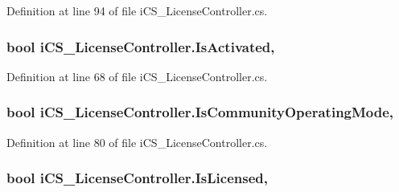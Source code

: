 Definition at line 94 of file i\+C\+S\+\_\+\+License\+Controller.\+cs.

\hypertarget{classi_c_s___license_controller_aad3df38dc7ac4c182e24b4b84d1aac85}{
\subsubsection[{Is\+Activated}]{\setlength{\rightskip}{0pt plus 5cm}bool i\+C\+S\+\_\+\+License\+Controller.\+Is\+Activated\hspace{0.3cm}{\ttfamily [static]}, {\ttfamily [get]}}}\label{classi_c_s___license_controller_aad3df38dc7ac4c182e24b4b84d1aac85}


Definition at line 68 of file i\+C\+S\+\_\+\+License\+Controller.\+cs.

\hypertarget{classi_c_s___license_controller_ae135063a15f1f112b3bf19429723ad89}{
\subsubsection[{Is\+Community\+Operating\+Mode}]{\setlength{\rightskip}{0pt plus 5cm}bool i\+C\+S\+\_\+\+License\+Controller.\+Is\+Community\+Operating\+Mode\hspace{0.3cm}{\ttfamily [static]}, {\ttfamily [get]}}}\label{classi_c_s___license_controller_ae135063a15f1f112b3bf19429723ad89}


Definition at line 80 of file i\+C\+S\+\_\+\+License\+Controller.\+cs.

\hypertarget{classi_c_s___license_controller_a2ca606cc06c0244d43a9b2d17ee0db33}{
\subsubsection[{Is\+Licensed}]{\setlength{\rightskip}{0pt plus 5cm}bool i\+C\+S\+\_\+\+License\+Controller.\+Is\+Licensed\hspace{0.3cm}{\ttfamily [static]}, {\ttfamily [get]}}}\label{classi_c_s___license_controller_a2ca606cc06c0244d43a9b2d17ee0db33}


